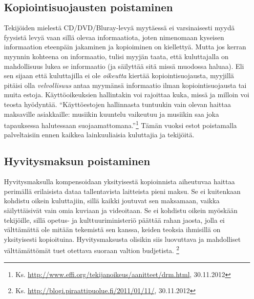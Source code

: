 \documentclass[titlepage,12pt]{article}
\begin{document}
\subsection{Kopiointisuojausten poistaminen}

Tekijöiden mielestä CD/DVD/Bluray-levyä myytäessä ei varsinaisesti
myydä fyysistä levyä vaan sillä olevaa informaatiota, joten nimenomaan
kyseisen informaation eteenpäin jakaminen ja kopioiminen on
kiellettyä.  Mutta jos kerran myynnin kohteena on informaatio, tulisi
myyjän taata, että kuluttajalla on mahdollisuus lukea se informaatio
(ja säilyttää sitä missä muodossa haluaa).  Eli sen sijaan että
kuluttajilla ei ole \emph{oikeutta} kiertää kopiointisuojausta,
myyjillä pitäisi olla \emph{velvollisuus} antaa myymänsä informaatio
ilman kopiointisuojausta tai muita estoja.
%
%
%
%
Käyttöoikeuksien hallintakin voi rajoittaa kuka, missä ja milloin voi
teosta hyödyntää.  ``Käyttöestojen hallinnasta tuntuukin vain olevan
haittaa maksaville asiakkaille: musiikin kuuntelu vaikeutuu ja
musiikin saa joka tapauksessa halutessaan
suojaamattomana.''\footnote{Ks. \url{http://www.effi.org/tekijanoikeus/aanitteet/drm.html},
  30.11.2012} Tämän vuoksi estot poistamalla palveltaisiin ennen
kaikkea lainkuuliaisia kuluttajia ja tekijöitä.




\subsection{Hyvitysmaksun poistaminen}

Hyvitysmaksulla kompensoidaan yksityisestä kopioinnista aiheutuvaa
haittaa perimällä erilaisista dataa tallentavista laitteista pieni
maksu.  Se ei kuitenkaan kohdistu oikein kuluttajiin, sillä kaikki
joutuvat sen maksamaan, vaikka säilyttäisivät vain omia kuviaan ja
videoitaan.  Se ei kohdistu oikein myöskään tekijöille, sillä opetus-
ja kulttuuriministeriö päättää rahan jaosta, jolla ei välttämättä ole
mitään tekemistä sen kanssa, keiden teoksia ihmisillä on yksityisesti
kopioituina.  Hyvitysmaksusta olisikin siis luovuttava ja mahdolliset
välttämättömät tuet otettava suoraan valtion budjetista.
\footnote{Ks. \url{http://blogi.piraattipuolue.fi/2011/01/11/},
  30.11.2012}
\end{document}
